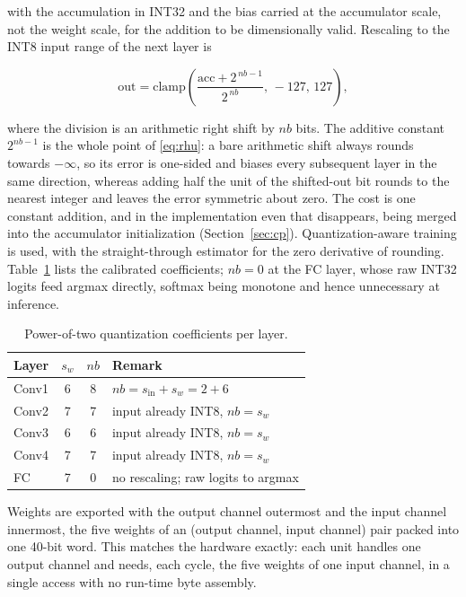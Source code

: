 \documentclass[conference,10pt]{IEEEtran}
\begin{document}
with the accumulation in INT32 and the bias carried at the accumulator scale, not
the weight scale, for the addition to be dimensionally valid. Rescaling to the
INT8 input range of the next layer is

\begin{equation}
\label{eq:rhu}
\mathrm{out} = \mathrm{clamp}\!\left( \frac{\mathrm{acc} + 2^{\,nb-1}}{2^{\,nb}},\,
-127,\,127 \right),
\end{equation}

where the division is an arithmetic right shift by $nb$ bits. The additive
constant $2^{nb-1}$ is the whole point of \eqref{eq:rhu}: a bare arithmetic shift
always rounds towards $-\infty$, so its error is one-sided and biases every
subsequent layer in the same direction, whereas adding half the unit of the
shifted-out bit rounds to the nearest integer and leaves the error symmetric
about zero. The cost is one constant addition, and in the implementation even
that disappears, being merged into the accumulator initialization
(Section~\ref{sec:cp}). Quantization-aware training is used, with the
straight-through estimator \cite{bengio2013} for the zero derivative of rounding.
Table~\ref{tab:qparams} lists the calibrated coefficients; $nb=0$ at the FC
layer, whose raw INT32 logits feed argmax directly, softmax being monotone and
hence unnecessary at inference.

\begin{table}[t]
\caption{Power-of-two quantization coefficients per layer.}
\label{tab:qparams}
\centering
\footnotesize
\begin{tabular}{lccl}
\toprule
Layer & $s_w$ & $nb$ & Remark \\
\midrule
Conv1 & 6 & 8 & $nb = s_{\text{in}} + s_w = 2+6$ \\
Conv2 & 7 & 7 & input already INT8, $nb=s_w$ \\
Conv3 & 6 & 6 & input already INT8, $nb=s_w$ \\
Conv4 & 7 & 7 & input already INT8, $nb=s_w$ \\
FC    & 7 & 0 & no rescaling; raw logits to argmax \\
\bottomrule
\end{tabular}
\end{table}

Weights are exported with the output channel outermost and the input channel
innermost, the five weights of an (output channel, input channel) pair packed
into one 40-bit word. This matches the hardware exactly: each unit handles one
output channel and needs, each cycle, the five weights of one input channel, in a
single access with no run-time byte assembly.
\end{document}

